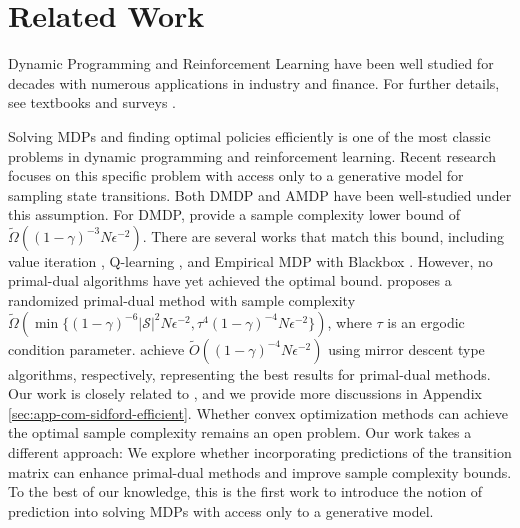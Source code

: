 \section{Related Work}

Dynamic Programming and Reinforcement Learning have been well studied for decades with numerous applications in industry and finance. For further details, see textbooks \cite{bellman1966dynamic,bertsekas1996neuro,bertsekas2012dynamic,bertsekas2022abstract,sutton2018reinforcement,szepesvari2022algorithms} and surveys \cite{kaelbling1996reinforcement,arulkumaran2017deep}.

Solving MDPs and finding optimal policies efficiently is one of the most classic problems in dynamic programming and reinforcement learning. 
Recent research focuses on this specific problem with access only to a generative model for sampling state transitions. Both DMDP and AMDP have been well-studied under this assumption. For DMDP, \cite{gheshlaghi2013minimax} provide a sample complexity lower bound of $\tilde{\Omega}((1-\gamma)^{-3} N \epsilon^{-2})$. There are several works that match this bound, including value iteration \cite{sidford2018near}, Q-learning \cite{wainwright2019variance}, and Empirical MDP with Blackbox \cite{agarwal2020model}.
However, no primal-dual algorithms have yet achieved the optimal bound. \cite{wang2020randomized} proposes a randomized primal-dual method with sample complexity $\tilde{\Omega}(\min\{(1-\gamma)^{-6} |\mathcal{S}|^2N \epsilon^{-2},\tau^{4}(1-\gamma)^{-4} N \epsilon^{-2}\})$, where $\tau$ is an ergodic condition parameter. 
\cite{jin2020efficiently,cheng2020reduction} achieve $\tilde{O}((1-\gamma)^{-4} N \epsilon^{-2})$ using mirror descent type algorithms, respectively, representing the best results for primal-dual methods. Our work is closely related to \cite{jin2020efficiently}, and we provide more discussions in Appendix \ref{sec:app-com-sidford-efficient}.
Whether convex optimization methods can achieve the optimal sample complexity remains an open problem.
Our work takes a different approach: We explore whether incorporating predictions of the transition matrix can enhance primal-dual methods and improve sample complexity bounds. To the best of our knowledge, this is the first work to introduce the notion of prediction into solving MDPs with access only to a generative model.

